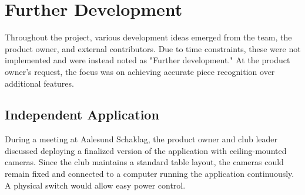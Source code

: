













\section{Further Development}
Throughout the project, various development ideas emerged from the team, the product owner, and external contributors. Due to time constraints, these were not implemented and were instead noted as "Further development." At the product owner's request, the focus was on achieving accurate piece recognition over additional features.

\subsection{Independent Application}
During a meeting at Aalesund Schaklag, the product owner and club leader discussed deploying a finalized version of the application with ceiling-mounted cameras. Since the club maintains a standard table layout, the cameras could remain fixed and connected to a computer running the application continuously. A physical switch would allow easy power control.

